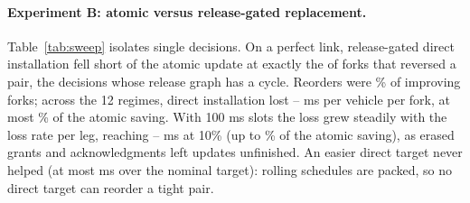 \documentclass[10pt]{article}
\begin{document}
\paragraph{Experiment B: atomic versus release-gated replacement.} Table~\ref{tab:sweep} isolates single decisions. On a perfect link, release-gated direct installation fell short of the atomic update at exactly the \nSweepShortDirect{} of \nSweepForks{} forks that reversed a pair, the decisions whose release graph has a cycle. Reorders were \nSweepReorderShare\% of improving forks; across the 12 regimes, direct installation lost \nSweepGapPerfectMin--\nSweepGapPerfectMax{} ms per vehicle per fork, at most \nSweepGapPerfectShareMax\% of the atomic saving. With 100 ms slots the loss grew steadily with the loss rate per leg, reaching \nSweepGapNineMin--\nSweepGapNineMax{} ms at 10\% (up to \nSweepGapNineShareMax\% of the atomic saving), as erased grants and acknowledgments left updates unfinished. An easier direct target never helped (at most \nSweepMenuMax{} ms over the nominal target): rolling schedules are packed, so no direct target can reorder a tight pair.

\begin{table}[t]\centering\small
\caption{\textbf{Experiments B and C at single decisions} ($\sigma=1$ s, $h_f=3$ s; 32 streams per load). Atomic saving and differences in ms per live vehicle per fork, 95\% intervals. Reorders: forks reversing a pair (in brackets: completable with one temporary booking). Detour: the temporary booking chosen for a perfect link.}\label{tab:sweep}
\resizebox{\linewidth}{!}{}
\end{table}
\end{document}
